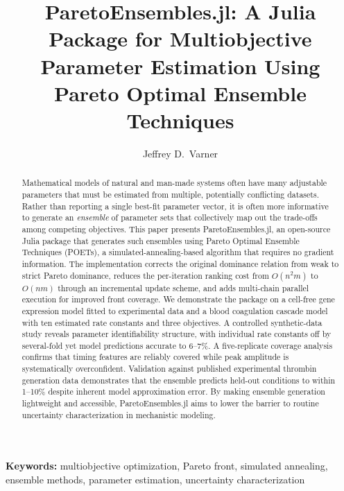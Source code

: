 \documentclass[12pt]{article}
\title{ParetoEnsembles.jl: A Julia Package for Multiobjective Parameter Estimation Using Pareto Optimal Ensemble Techniques}
\author[1]{Jeffrey D.\ Varner}
\affil[1]{Robert Frederick Smith School of Chemical and Biomolecular Engineering, Cornell University, Ithaca, NY 14853, USA}
\date{}
\begin{document}
\maketitle

\begin{abstract}
Mathematical models of natural and man-made systems often have many adjustable parameters that must be estimated from multiple, potentially conflicting datasets. Rather than reporting a single best-fit parameter vector, it is often more informative to generate an \emph{ensemble} of parameter sets that collectively map out the trade-offs among competing objectives. This paper presents ParetoEnsembles.jl, an open-source Julia package that generates such ensembles using Pareto Optimal Ensemble Techniques (POETs), a simulated-annealing-based algorithm that requires no gradient information. The implementation corrects the original dominance relation from weak to strict Pareto dominance, reduces the per-iteration ranking cost from $O(n^2 m)$ to $O(nm)$ through an incremental update scheme, and adds multi-chain parallel execution for improved front coverage. We demonstrate the package on a cell-free gene expression model fitted to experimental data and a blood coagulation cascade model with ten estimated rate constants and three objectives. A controlled synthetic-data study reveals parameter identifiability structure, with individual rate constants off by several-fold yet model predictions accurate to 6--7\%. A five-replicate coverage analysis confirms that timing features are reliably covered while peak amplitude is systematically overconfident. Validation against published experimental thrombin generation data demonstrates that the ensemble predicts held-out conditions to within 1--10\% despite inherent model approximation error. By making ensemble generation lightweight and accessible, ParetoEnsembles.jl aims to lower the barrier to routine uncertainty characterization in mechanistic modeling.
\end{abstract}

\noindent\textbf{Keywords:} multiobjective optimization, Pareto front, simulated annealing, ensemble methods, parameter estimation, uncertainty characterization

\bigskip

\end{document}
